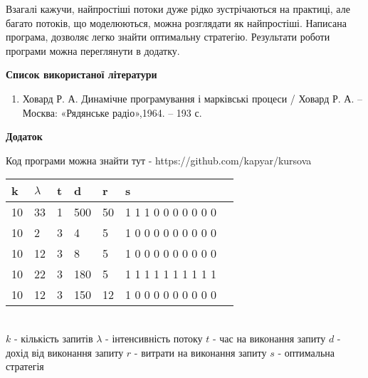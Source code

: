 \documentclass[a4paper, 14pt]{extarticle}
\begin{document}
\par Взагалі кажучи, найпростіші потоки дуже рідко зустрічаються на практиці, але багато потоків, що моделюються, можна розглядати як найпростіші.
Написана програма, дозволяє легко знайти оптимальну стратегію. Результати роботи програми можна переглянути в додатку.

\newpage

\begin{center}
	{\Large \textbf{Список використаної літератури}}
\end{center}

\begin{enumerate}
 Л. Г. Керовані марківські і полумарківські моделі і деякі задачі оптимізації стохастичних систем / Губенко Л.Г. Штатланд Е.С.

\item Ховард Р. А. Динамічне програмування і марківські процеси / Ховард Р. А. – Москва: «Рядянське радіо»,1964. – 193 с.



\end{enumerate}
 

\newpage
\begin{center}
	{\Large \textbf{Додаток}}
\end{center}
Код програми можна знайти тут -  https://github.com/kapyar/kursova \newline

\begin{tabularx}{\textwidth}{ |X|X|X|X|X|X|X }
  \hline
  k & $\lambda$ & t & d & r & s \\
  \hline
 	10  & 33  & 1  & 500 & 50 & 1  1    1    0    0    0    0    0    0    0   \\
  \hline
   10  & 2  & 3  & 4 & 5 & 1    0    0    0    0    0    0    0    0    0 \\
  \hline
   10  & 12  & 3  &8 &5 &  1    0    0    0    0    0    0    0    0    0            \\
  \hline
   10  & 22  &3  & 180 & 5 & 1    1    1    1    1    1    1    1    1    1  \\
  \hline
   10  & 12   & 3 & 150 & 12 & 1    0    0    0    0    0    0    0    0    0  \\
  \hline
\end{tabularx}\\

$k$ - кількість запитів\newline
$\lambda$ - інтенсивність потоку\newline
$t$ - час на виконання запиту\newline
$d$ - дохід від виконання запиту\newline
$r$ - витрати на виконання запиту\newline
$s$ - оптимальна стратегія\newline


	




		
\end{document}
